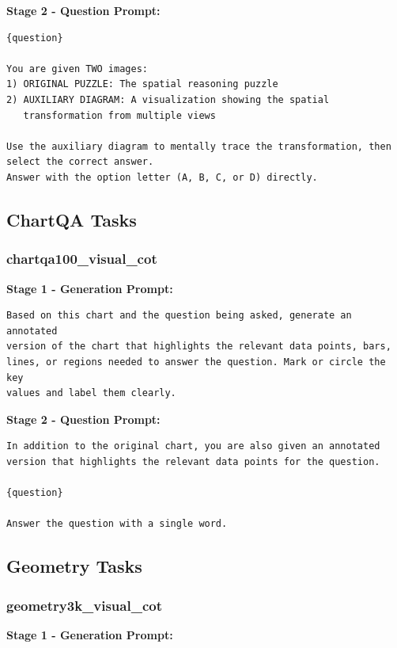 \documentclass{article}
\theoremstyle{plain}
\theoremstyle{definition}
\theoremstyle{remark}
\begin{document}
\textbf{Stage 2 - Question Prompt:}

\begin{verbatim}
{question}

You are given TWO images:
1) ORIGINAL PUZZLE: The spatial reasoning puzzle
2) AUXILIARY DIAGRAM: A visualization showing the spatial
   transformation from multiple views

Use the auxiliary diagram to mentally trace the transformation, then
select the correct answer.
Answer with the option letter (A, B, C, or D) directly.
\end{verbatim}

\subsection{ChartQA Tasks}

\subsubsection{chartqa100\_visual\_cot}

\textbf{Stage 1 - Generation Prompt:}

\begin{verbatim}
Based on this chart and the question being asked, generate an annotated
version of the chart that highlights the relevant data points, bars,
lines, or regions needed to answer the question. Mark or circle the key
values and label them clearly.
\end{verbatim}

\textbf{Stage 2 - Question Prompt:}

\begin{verbatim}
In addition to the original chart, you are also given an annotated
version that highlights the relevant data points for the question.

{question}

Answer the question with a single word.
\end{verbatim}

\subsection{Geometry Tasks}

\subsubsection{geometry3k\_visual\_cot}

\textbf{Stage 1 - Generation Prompt:}
\end{document}
